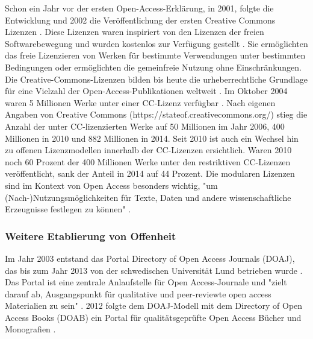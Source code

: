 Schon ein Jahr vor der ersten Open-Access-Erklärung, in 2001, folgte die Entwicklung und 2002 die Veröffentlichung der ersten Creative Commons Lizenzen \cite{garcia_2010_open}. Diese Lizenzen waren inspiriert von den Lizenzen der freien Softwarebewegung und wurden kostenlos zur Verfügung gestellt \cite{Minjeong_2007}. Sie ermöglichten das freie Lizenzieren von Werken für bestimmte Verwendungen unter bestimmten Bedingungen oder ermöglichten die gemeinfreie Nutzung ohne Einschränkungen. Die Creative-Commons-Lizenzen bilden bis heute die urheberrechtliche Grundlage für eine Vielzahl der Open-Access-Publikationen weltweit \cite{suchen}. Im Oktober 2004 waren 5 Millionen Werke unter einer CC-Lizenz verfügbar \cite{Suchen_Forbes_Movement_Seeks_Copyright_Alternatives}. Nach eigenen Angaben von Creative Commons (https://stateof.creativecommons.org/) stieg die Anzahl der unter CC-lizenzierten Werke auf 50 Millionen im Jahr 2006, 400 Millionen in 2010 und 882 Millionen in 2014. Seit 2010 ist auch ein Wechsel hin zu offenen Lizenzmodellen innerhalb der CC-Lizenzen ersichtlich. Waren 2010 noch 60 Prozent der 400 Millionen Werke unter den restriktiven CC-Lizenzen veröffentlicht, sank der Anteil in 2014 auf 44 Prozent. Die modularen Lizenzen sind im Kontext von Open Access besonders wichtig, "um (Nach-)Nutzungsmöglichkeiten für Texte, Daten und andere wissenschaftliche Erzeugnisse festlegen zu können" \cite{suchen-Hoffmann-Zugang-undVerwertung-oeffentlicher-Informationen}.

\subsubsection{Weitere Etablierung von Offenheit}

Im Jahr 2003 entstand das Portal Directory of Open Access Journals (DOAJ), das bis zum Jahr 2013 von der schwedischen Universität Lund betrieben wurde \cite{doaj_2015_about}. Das Portal ist eine zentrale Anlaufstelle für Open Access-Journale \cite{suber_2015} und "zielt darauf ab, Ausgangspunkt für qualitative und peer-reviewte open access Materialien zu sein" \cite{doaj_2015_about}. 2012 folgte dem DOAJ-Modell mit dem Directory of Open Access Books (DOAB) ein Portal für qualitätsgeprüfte Open Access Bücher und Monografien \cite{adema_2013_political}.

